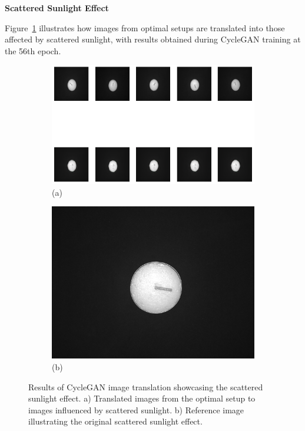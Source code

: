 \documentclass[12pt,DIV14,BCOR12mm,a4paper,footinclude=false,headinclude,parskip=half-,twoside,openright,cleardoublepage=empty,toc=index,bibliography=totoc,listof=totoc]{scrreprt}
\numberwithin{equation}{chapter}
\begin{document}
\textbf{Scattered Sunlight Effect}

Figure~\ref{fig:scattered_sunlight_result} illustrates how images from optimal setups are translated into those affected by scattered sunlight, with results obtained during CycleGAN training at the 56th epoch. 

\begin{figure}
    \centering
    \begin{subfigure}[b]{1.0\textwidth}
        \centering
        \includegraphics[width=\textwidth]{../media/candles_sunlight.png}
        \caption*{(a)}
    \end{subfigure}
    \hfill
    \begin{subfigure}[b]{0.25\textwidth}
        \centering
        \includegraphics[width=\textwidth]{../media/candles_sunlight_real.png}
        \caption*{(b)}
    \end{subfigure}
    \caption{Results of CycleGAN image translation showcasing the scattered sunlight effect. a) Translated images from the optimal setup to images influenced by scattered sunlight. b) Reference image illustrating the original scattered sunlight effect.}
    \label{fig:scattered_sunlight_result}
\end{figure}
\end{document}
